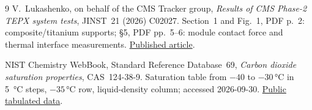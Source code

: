 \begin{thebibliography}{9}
 V.~Lukashenko, on behalf of the CMS Tracker group,
\emph{Results of CMS Phase-2 TEPX system tests}, JINST~21 (2026) C02027.
Section~1 and Fig.~1, PDF p.~2: composite/titanium supports;
\S5, PDF pp.~5--6: module contact force and thermal interface measurements.
\href{https://doi.org/10.1088/1748-0221/21/02/C02027}{Published article}.

 NIST Chemistry WebBook, Standard Reference Database~69,
\emph{Carbon dioxide saturation properties}, CAS~124-38-9. Saturation table
from $-40$ to $-30\,\unit{\degreeCelsius}$ in \qty{5}{\degreeCelsius} steps,
$-35\,\unit{\degreeCelsius}$ row, liquid-density column; accessed 2026-09-30. \href{https://webbook.nist.gov/cgi/fluid.cgi?Action=Data&Wide=on&ID=C124389&Type=SatP&Digits=5&THigh=-30&TLow=-40&TInc=5&RefState=DEF&TUnit=C&PUnit=bar&DUnit=kg\%2Fm3&HUnit=kJ\%2Fkg&WUnit=m\%2Fs&VisUnit=uPa*s&STUnit=N\%2Fm}{Public tabulated data}.
\end{thebibliography}
\endgroup
